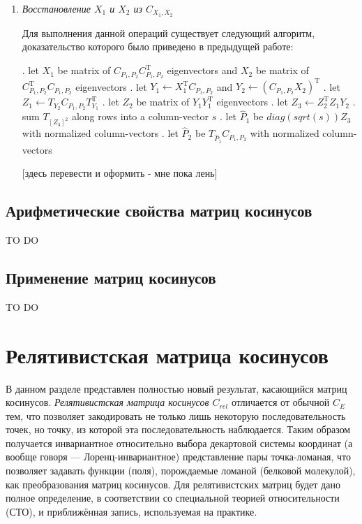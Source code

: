 \begin{enumerate}
\item \textit{Восстановление $X_1$ и $X_2$ из $C_{X_1, X_2}$}

Для выполнения данной операций существует следующий алгоритм, доказательство которого было приведено в предыдущей работе:

\begin{algorithmic}
. let \(X_1\) be matrix of \(C_{P_1,P_2}C^\mathrm{T}_{P_1,P_2}\) eigenvectors and \({X_2}\) be matrix of \(C^\mathrm{T}_{P_1,P_2}C_{P_1,P_2}\) eigenvectors
. let \(Y_1 \gets X^\mathrm{T}_1 C_{P_1,P_2}\) and \(Y_2 \gets (C_{P_1,P_2} X_2)^\mathrm{T}\)
. let \(Z_1 \gets T_{Y_2} C_{P_1,P_2} T^\mathrm{T}_{Y_1}\)
. let \(Z_2\) be matrix of \(Y_1 Y^\mathrm{T}_1\) eigenvectors
. let \(Z_3 \gets Z^\mathrm{T}_2 Z_1 Y_2\)
. sum \(T_{[Z_3]^2}\) along rows into a column-vector \(s\)
. let \(\hat{P}_1\) be \(diag(sqrt(s)) Z_3\) with normalized column-vectors
. let \(\hat{P}_2\) be \(T_{\hat{P}_1} C_{P_1,P_2}\) with normalized column-vectors
\end{algorithmic}

[здесь перевести и оформить - мне пока лень]

\end{enumerate}
 
\subsection{Арифметические свойства матриц косинусов}

TO DO

\subsection{Применение матриц косинусов}

TO DO

\section{Релятивистская матрица косинусов}

В данном разделе представлен полностью новый результат, касающийся матриц косинусов.  \textit{Релятивистская матрица косинусов $C_{rel}$} отличается от обычной $C_E$ тем, что позволяет закодировать не только лишь некоторую последовательность точек, но точку, из которой эта последовательность наблюдается. Таким образом получается инвариантное относительно выбора декартовой системы координат (а вообще говоря --- Лоренц-инвариантное) представление пары точка-ломаная, что позволяет задавать функции (поля), порождаемые ломаной (белковой молекулой), как преобразования матриц косинусов. Для релятивистских матриц будет дано полное определение, в соответствии со специальной теорией относительности (СТО), и приближённая запись, используемая на практике.


